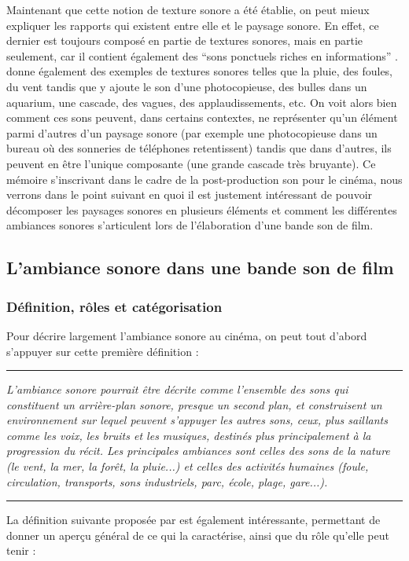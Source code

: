 ﻿\documentclass[12pt]{article}
\newcommand{\citationpropre}[3]{
\vspace{1.7em}
\hrule
\vspace{0.8em}

\textit{#1}

\hfill \parencite[#2]{#3}

\vspace{0.6em}
\hrule
\vspace{1.7em}
}
\begin{document}
Maintenant que cette notion de texture sonore a été établie, on peut mieux expliquer les rapports qui existent entre elle et le paysage sonore. En effet, ce dernier est toujours composé en partie de textures sonores, mais en partie seulement, car il contient également des \enquote{sons ponctuels riches en informations} \parencite{schwarz_state_2011}. \textcite{schwarz_state_2011} donne également des exemples de textures sonores telles que la pluie, des foules, du vent tandis que \textcite{saint-arnaud_classification_1995} y ajoute le son d'une photocopieuse, des bulles dans un aquarium, une cascade, des vagues, des applaudissements, etc. On voit alors bien comment ces sons peuvent, dans certains contextes, ne représenter qu'un élément parmi d'autres d'un paysage sonore (par exemple une photocopieuse dans un bureau où des sonneries de téléphones retentissent) tandis que dans d'autres, ils peuvent en être l'unique composante (une grande cascade très bruyante). Ce mémoire s'inscrivant dans le cadre de la post-production son pour le cinéma, nous verrons dans le point suivant en quoi il est justement intéressant de pouvoir décomposer les paysages sonores en plusieurs éléments et comment les différentes ambiances sonores s'articulent lors de l'élaboration d'une bande son de film.


\subsection{L'ambiance sonore dans une bande son de film}
 \subsubsection{Définition, rôles et catégorisation}

Pour décrire largement l'ambiance sonore au cinéma, on peut tout d'abord s'appuyer sur cette première définition :

\citationpropre{L'ambiance sonore pourrait être décrite comme l'ensemble des sons qui constituent un arrière-plan sonore, presque un second plan, et construisent un environnement sur lequel peuvent s'appuyer les autres sons, ceux, plus saillants comme les voix, les bruits et les musiques, destinés plus principalement à la progression du récit. Les principales ambiances sont celles des sons de la nature (le vent, la mer, la forêt, la pluie...) et celles des activités humaines (foule, circulation, transports, sons industriels, parc, école, plage, gare...).}{}{adjiman_qualifier_2015}

La définition suivante proposée par \textcite{de_nanteuil_dictionnaire_2008} est également intéressante, permettant de donner un aperçu général de ce qui la caractérise, ainsi que du rôle qu'elle peut tenir :
\end{document}

